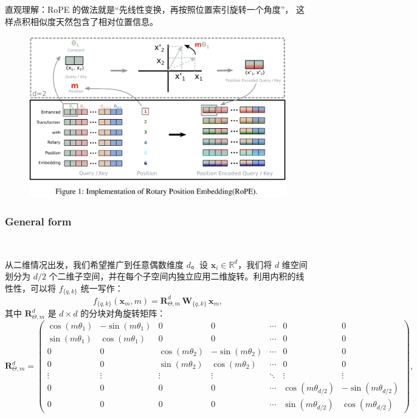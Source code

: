 直观理解：RoPE 的做法就是“先线性变换，再按照位置索引旋转一个角度”，
这样点积相似度天然包含了相对位置信息。

\begin{figure}[htbp]
  \centering
  \includegraphics[width=0.8\linewidth]{figs/lec3/lec3.18.png}
\end{figure}


\subsubsection{General form}~{}

从二维情况出发，我们希望推广到任意偶数维度 $d$。设 $\mathbf{x}_i \in \mathbb{R}^d$，我们将 $d$ 维空间划分为 $d/2$ 个二维子空间，并在每个子空间内独立应用二维旋转。利用内积的线性性，可以将 $f_{\{q, k\}}$ 统一写作：
\begin{equation*}
	f_{\{q, k\}}(\mathbf{x}_m, m) 
	= \mathbf{R}^d_{\Theta, m}\,\mathbf{W}_{\{q, k\}}\,\mathbf{x}_m,
	\label{fn:rope-fqk}
\end{equation*}
其中 $\mathbf{R}^d_{\Theta,m}$ 是 $d\times d$ 的分块对角旋转矩阵：
\begin{equation*}    
	\mathbf{R}^d_{\Theta,m} = 
	\begin{pmatrix}
		\cos(m\theta_1)& -\sin(m\theta_1)&0&0&\cdots&0&0\\
		\sin(m\theta_1)& \cos(m\theta_1)&0&0&\cdots&0&0 \\
		0&0&\cos(m\theta_2)& -\sin(m\theta_2)&\cdots&0&0\\
		0&0&\sin(m\theta_2)& \cos(m\theta_2)&\cdots&0&0 \\
		\vdots&\vdots&\vdots&\vdots&\ddots&\vdots&\vdots\\
		0&0&0&0&\cdots&\cos(m\theta_{d/2})& -\sin(m\theta_{d/2})\\
		0&0&0&0&\cdots&\sin(m\theta_{d/2})& \cos(m\theta_{d/2})
	\end{pmatrix},
	\label{fn:rope-RMat}
\end{equation*}

